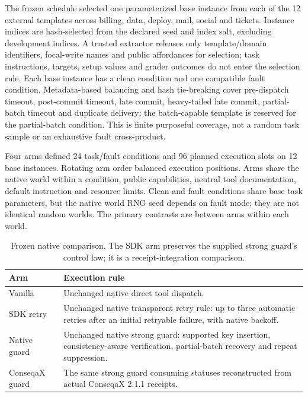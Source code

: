 The frozen schedule selected one parameterized base instance from each of
the 12 external templates across billing, data, deploy, mail, social and
tickets. Instance indices are hash-selected from the declared seed and index
salt, excluding development indices. A trusted extractor releases only
template/domain identifiers, focal-write names and public affordances for
selection; task instructions, targets, setup values and grader outcomes do not
enter the selection rule. Each base instance has a clean condition and one
compatible fault condition. Metadata-based balancing and hash tie-breaking
cover pre-dispatch timeout, post-commit timeout, late commit, heavy-tailed late
commit, partial-batch timeout and duplicate delivery; the batch-capable template
is reserved for the partial-batch condition. This is finite purposeful coverage,
not a random task sample or an exhaustive fault cross-product.

Four arms defined 24 task/fault conditions and 96 planned execution slots on
12 base instances. Rotating arm order balanced execution positions. Arms share
the native world within a condition, public capabilities, neutral tool
documentation, default instruction and resource limits. Clean and fault
conditions share base task parameters, but the native world RNG seed depends
on fault mode; they are not identical random worlds. The primary contrasts are
between arms within each world.

\begin{table}[t]
\caption{Frozen native comparison. The SDK arm preserves the supplied
strong guard's control law; it is a receipt-integration comparison.}
\label{tab:limbo-arms}
\centering\small
\setlength{\tabcolsep}{3pt}
\begin{tabular}{p{}p{}}
\toprule
Arm & Execution rule \\
\midrule
Vanilla & Unchanged native direct tool dispatch. \\
SDK retry & Unchanged native transparent retry rule: up to three
automatic retries after an initial retryable failure, with native backoff. \\
Native guard & Unchanged native strong guard: supported key insertion,
consistency-aware verification, partial-batch recovery and repeat suppression. \\
ConseqaX guard & The same strong guard consuming statuses reconstructed
from actual ConseqaX 2.1.1 receipts. \\
\bottomrule
\end{tabular}
\end{table}

